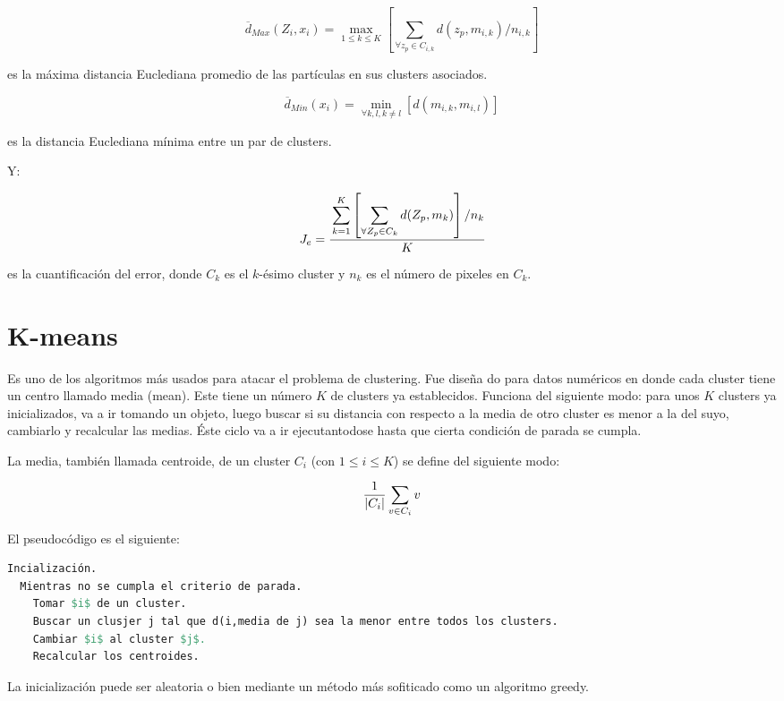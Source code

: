 \[
\overline{d}_{Max}(Z_i,x_i) = \max_{1 \leq k \leq K} \left[ \displaystyle\sum_{\forall z_p \in C_{i,k}} d(z_p,m_{i,k})/n_{i,k}\right]
\]

es la máxima distancia Euclediana promedio de las partículas en sus
clusters asociados.

\[
\overline{d}_{Min}(x_i) = \min_{\forall k, l, k \neq l} \left[ d(m_{i,k},m_{i,l})\right]
\]

es la distancia Euclediana mínima entre un par de clusters.

Y:

\[
J_e = \cfrac{\displaystyle\sum_{k = 1}^K \left[ \displaystyle\sum_{\forall Z_p \in C_k} d(Z_p, m_k) \right] / n_k}{K}
\]

es la cuantificación del error, donde $C_k$ es el $k$-ésimo cluster y $n_k$ es el número de pixeles
en $C_k$.


\section{K-means} \label{sect:kmeans}

Es uno de los algoritmos m\'as usados para atacar el problema de clustering.
Fue dise\~na do para datos num\'ericos en donde cada cluster tiene un centro llamado
media (mean). Este tiene un n\'umero $K$ de clusters ya establecidos. Funciona
del siguiente modo: para unos $K$ clusters ya inicializados, va a ir tomando 
un objeto, luego buscar si su distancia con respecto a la media de otro
cluster es menor a la del suyo, cambiarlo y recalcular las medias. \'Este
ciclo va a ir ejecutantodose hasta que cierta condici\'on de parada se cumpla.\cite{GePo2010}

La media, tambi\'en llamada centroide,  de un cluster $C_i$ (con $1 \leq i \leq K$)
se define del siguiente modo:

\[
{1 \over |C_{i}|} \sum_{v \in C_{i}} v
\]

El pseudoc\'odigo es el siguiente:

\begin{lstlisting}[mathescape, language=Pascal]
  Incialización.
  Mientras no se cumpla el criterio de parada.
    Tomar $i$ de un cluster.
    Buscar un clusjer j tal que d(i,media de j) sea la menor entre todos los clusters.
    Cambiar $i$ al cluster $j$.
    Recalcular los centroides.
\end{lstlisting}

La inicializaci\'on puede ser aleatoria o bien mediante un m\'etodo m\'as
sofiticado como un algoritmo greedy.


